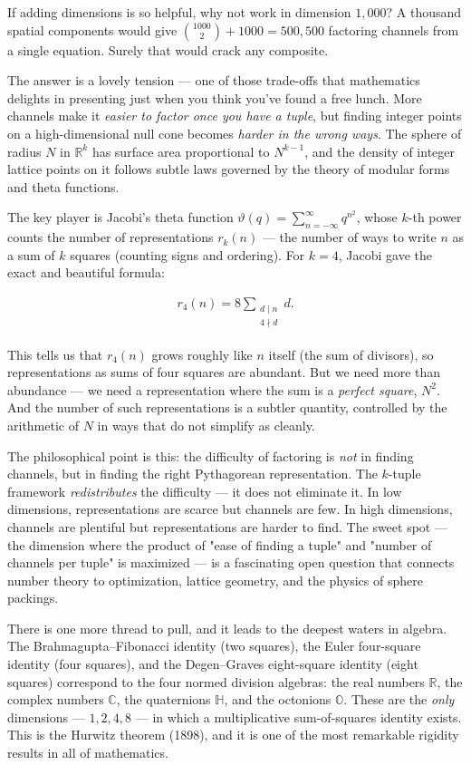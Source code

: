 \documentclass[11pt,twoside,openright]{book}
\theoremstyle{definition}
\theoremstyle{remark}
\begin{document}
If adding dimensions is so helpful, why not work in dimension $1{,}000$? A thousand spatial components would give $\binom{1000}{2} + 1000 = 500{,}500$ factoring channels from a single equation. Surely that would crack any composite.

The answer is a lovely tension --- one of those trade-offs that mathematics delights in presenting just when you think you've found a free lunch. More channels make it \textit{easier to factor once you have a tuple}, but finding integer points on a high-dimensional null cone becomes \textit{harder in the wrong ways}. The sphere of radius $N$ in $\mathbb{R}^k$ has surface area proportional to $N^{k-1}$, and the density of integer lattice points on it follows subtle laws governed by the theory of modular forms and theta functions.

The key player is Jacobi's theta function $\vartheta(q) = \sum_{n=-\infty}^{\infty} q^{n^2}$, whose $k$-th power counts the number of representations $r_k(n)$ --- the number of ways to write $n$ as a sum of $k$ squares (counting signs and ordering). For $k = 4$, Jacobi gave the exact and beautiful formula:

\begin{align*}
r_4(n) = 8 \sum_{\substack{d \mid n \\ 4 \nmid d}} d.
\end{align*}

This tells us that $r_4(n)$ grows roughly like $n$ itself (the sum of divisors), so representations as sums of four squares are abundant. But we need more than abundance --- we need a representation where the sum is a \textit{perfect square}, $N^2$. And the number of such representations is a subtler quantity, controlled by the arithmetic of $N$ in ways that do not simplify as cleanly.

The philosophical point is this: the difficulty of factoring is \textit{not} in finding channels, but in finding the right Pythagorean representation. The $k$-tuple framework \textit{redistributes} the difficulty --- it does not eliminate it. In low dimensions, representations are scarce but channels are few. In high dimensions, channels are plentiful but representations are harder to find. The sweet spot --- the dimension where the product of "ease of finding a tuple" and "number of channels per tuple" is maximized --- is a fascinating open question that connects number theory to optimization, lattice geometry, and the physics of sphere packings.

There is one more thread to pull, and it leads to the deepest waters in algebra. The Brahmagupta--Fibonacci identity (two squares), the Euler four-square identity (four squares), and the Degen--Graves eight-square identity (eight squares) correspond to the four normed division algebras: the real numbers $\mathbb{R}$, the complex numbers $\mathbb{C}$, the quaternions $\mathbb{H}$, and the octonions $\mathbb{O}$. These are the \textit{only} dimensions --- $1, 2, 4, 8$ --- in which a multiplicative sum-of-squares identity exists. This is the Hurwitz theorem (1898), and it is one of the most remarkable rigidity results in all of mathematics.
\end{document}

